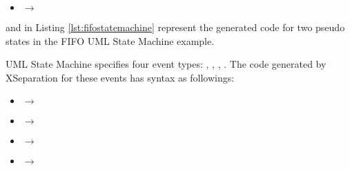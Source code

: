 \begin{itemize}[\footnotesize]
	\item {} $\rightarrow$  
	
	
	
	
	
	
	
	
	
\end{itemize}

 and  in Listing \ref{lst:fifostatemachine} represent the generated code for two  pseudo states in the FIFO UML State Machine example.  

\vskip 0.2cm
\noindent
{}
UML State Machine specifies four event types: , , , . The code generated by XSeparation for these events has syntax as followings:
\begin{itemize}[\footnotesize]
	\item {} $\rightarrow$  
	
	\item {} $\rightarrow$  
	
	\item {} $\rightarrow$ 
	
	\item {} $\rightarrow$  
\end{itemize}


